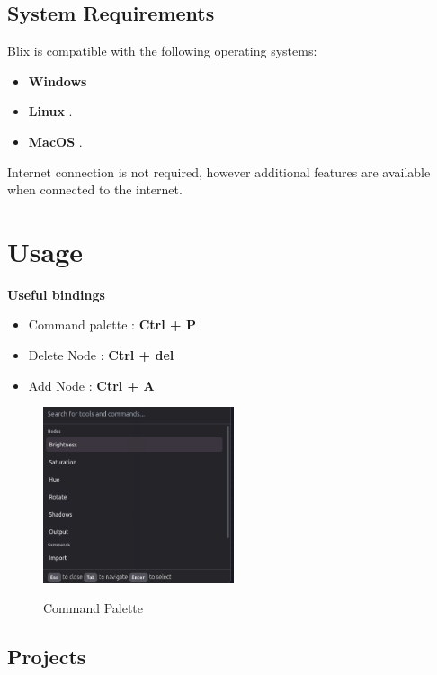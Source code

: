 \documentclass[11pt,a4paper]{article}
\begin{document}
\subsection*{System Requirements}

Blix is compatible with the following operating systems:
\begin{itemize}
  \item[\textbullet] \textbf{Windows}
  \item[\textbullet] \textbf{Linux }.
  \item[\textbullet] \textbf{MacOS }.
\end{itemize}

 Internet connection is not required, however additional features are available when connected to the internet.

\section*{Usage}

\textbf{Useful bindings}
\begin{itemize}
  \item[\textbullet] Command palette : \textbf{Ctrl + P}
  \item[\textbullet] Delete Node : \textbf{Ctrl + del}
  \item[\textbullet] Add Node : \textbf{Ctrl + A}
\end{itemize}

\begin{figure}[H]
  \centering
  {\includegraphics[width=0.5\textwidth]{../pics/palette.png}}
  \caption{Command Palette}
\end{figure}


\subsection*{Projects}
\end{document}
